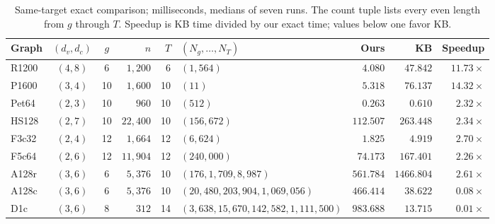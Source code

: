 \begin{table}[t]
\centering
\caption{Same-target exact comparison; milliseconds, medians of seven runs.
The count tuple lists every even length from $g$ through $T$.
Speedup is KB time divided by our exact time; values below one favor KB.}
\label{tab:exact-exp}
\footnotesize
\setlength{\tabcolsep}{5pt}
\begin{tabular}{lccrrlrrr}
\hline
Graph & $(d_v,d_c)$ & $g$ & $n$ & $T$ & $(N_g,\ldots,N_T)$ & Ours & KB & Speedup\\
\hline
R1200 & $(4,8)$ & 6 & $1,200$ & 6 & $(1,564)$ & $4.080$ & $47.842$ & $11.73\times$\\
P1600 & $(3,4)$ & 10 & $1,600$ & 10 & $(11)$ & $5.318$ & $76.137$ & $14.32\times$\\
Pet64 & $(2,3)$ & 10 & $960$ & 10 & $(512)$ & $0.263$ & $0.610$ & $2.32\times$\\
HS128 & $(2,7)$ & 10 & $22,400$ & 10 & $(156,672)$ & $112.507$ & $263.448$ & $2.34\times$\\
F3c32 & $(2,4)$ & 12 & $1,664$ & 12 & $(6,624)$ & $1.825$ & $4.919$ & $2.70\times$\\
F5c64 & $(2,6)$ & 12 & $11,904$ & 12 & $(240,000)$ & $74.173$ & $167.401$ & $2.26\times$\\
A128r & $(3,6)$ & 6 & $5,376$ & 10 & $(176, 1,709, 8,987)$ & $561.784$ & $1466.804$ & $2.61\times$\\
A128c & $(3,6)$ & 6 & $5,376$ & 10 & $(20,480, 203,904, 1,069,056)$ & $466.414$ & $38.622$ & $0.08\times$\\
D1c & $(3,6)$ & 8 & $312$ & 14 & $(3,638, 15,670, 142,582, 1,111,500)$ & $983.688$ & $13.715$ & $0.01\times$\\
\hline
\end{tabular}
\end{table}

